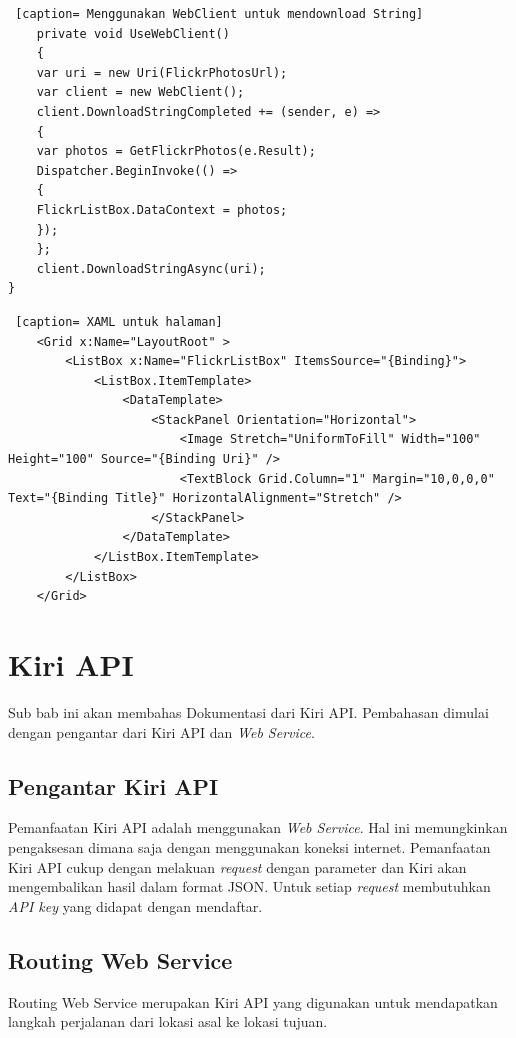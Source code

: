 \begin{lstlisting} [caption= Menggunakan WebClient untuk mendownload String]
	private void UseWebClient()
	{
	var uri = new Uri(FlickrPhotosUrl);
	var client = new WebClient();
	client.DownloadStringCompleted += (sender, e) =>
	{
	var photos = GetFlickrPhotos(e.Result);
	Dispatcher.BeginInvoke(() =>
	{
	FlickrListBox.DataContext = photos;
	});
	};
	client.DownloadStringAsync(uri);
}
\end{lstlisting}

\begin{lstlisting} [caption= XAML untuk halaman]
	<Grid x:Name="LayoutRoot" >
		<ListBox x:Name="FlickrListBox" ItemsSource="{Binding}">
			<ListBox.ItemTemplate>
				<DataTemplate>
					<StackPanel Orientation="Horizontal">
						<Image Stretch="UniformToFill" Width="100" Height="100" Source="{Binding Uri}" />
						<TextBlock Grid.Column="1" Margin="10,0,0,0" Text="{Binding Title}" HorizontalAlignment="Stretch" />
					</StackPanel>
				</DataTemplate>
			</ListBox.ItemTemplate>
		</ListBox>
	</Grid>
\end{lstlisting}

\section{Kiri API}
\label{sec:Kiri API}
\hspace{0.5cm} Sub bab ini akan membahas Dokumentasi dari Kiri API. Pembahasan dimulai dengan pengantar dari Kiri API dan \textit{Web Service}.

\subsection{Pengantar Kiri API}
\label{subsec:Pengantar Kiri API}
\hspace{0.5cm} Pemanfaatan Kiri API adalah menggunakan \textit{Web Service}. Hal ini memungkinkan pengaksesan dimana saja dengan menggunakan koneksi internet. Pemanfaatan Kiri API cukup dengan melakuan \textit{request} dengan parameter dan Kiri akan mengembalikan hasil dalam format JSON. Untuk setiap \textit{request} membutuhkan \textit{API key} yang didapat dengan mendaftar\footnotemark[2]. 

\subsection{Routing Web Service}
\label{subsec:Routing Web Service}
\hspace{0.5cm} Routing Web Service merupakan Kiri API yang digunakan untuk mendapatkan langkah perjalanan dari lokasi asal ke lokasi tujuan.


